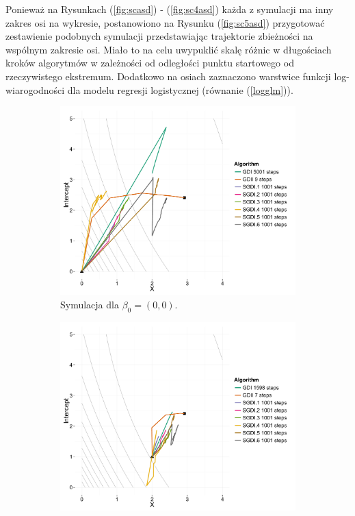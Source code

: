 Ponieważ na Rysunkach (\ref{fig:scasd}) - (\ref{fig:sc4asd}) każda z symulacji ma inny zakres osi na wykresie, postanowiono na Rysunku (\ref{fig:sc5asd}) przygotować zestawienie podobnych symulacji przedstawiając trajektorie zbieżności na wspólnym zakresie osi. Miało to na celu uwypuklić skalę różnic w długościach kroków algorytmów w zależności od odległości punktu startowego od rzeczywistego ekstremum. Dodatkowo na osiach zaznaczono warstwice funkcji log-wiarogodności dla modelu regresji logistycznej (równanie (\ref{logglm})).

\begin{figure}[h!]
  \begin{center}
   \begin{subfigure}[h!]{0.45\textwidth}
     \includegraphics[width=\textwidth]{Obrazki/contour_00.pdf}
     \caption{Symulacja dla $\beta_0 = (0,0)$.}
   \end{subfigure}
   \begin{subfigure}[h!]{0.45\textwidth}
        \includegraphics[width=\textwidth]{Obrazki/contour_2_1.pdf}

\end{subfigure}
\end{center}
\end{figure}
